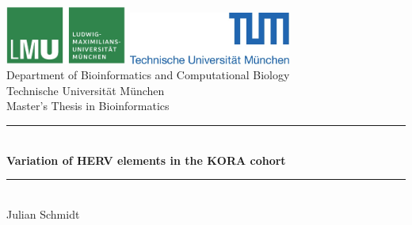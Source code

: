 \documentclass[a4paper,12pt]{article}
\newcommand{\HRule}{\rule{\linewidth}{0.5mm}}
\begin{document}
\sloppy
\sectionfont{\LARGE}
\subsectionfont{\Large}
\subsubsectionfont{\Large}

\begin{titlepage}


\sffamily

\begin{center}


\includegraphics[width=0.3\textwidth]{../figures/LMU-logo.jpg}
\hfill
\includegraphics[width=0.4\textwidth]{../figures/TUM-logo.jpg}  
\\[5cm]

{\LARGE Department of Bioinformatics and Computational Biology}\\[0.5cm]
{Technische Universit\"at M\"unchen}\\
[2cm]
{\Large Master's Thesis in Bioinformatics}\\[1.5cm]

\HRule \\[0.4cm]
{ \huge \bfseries Variation of HERV elements in the KORA cohort
}\\[0.4cm]

\HRule \\[1.5cm]

{\Large Julian Schmidt}\\[2.5cm]

\vfill
\end{center}
\end{titlepage}
\pagestyle{empty}
\end{document}
